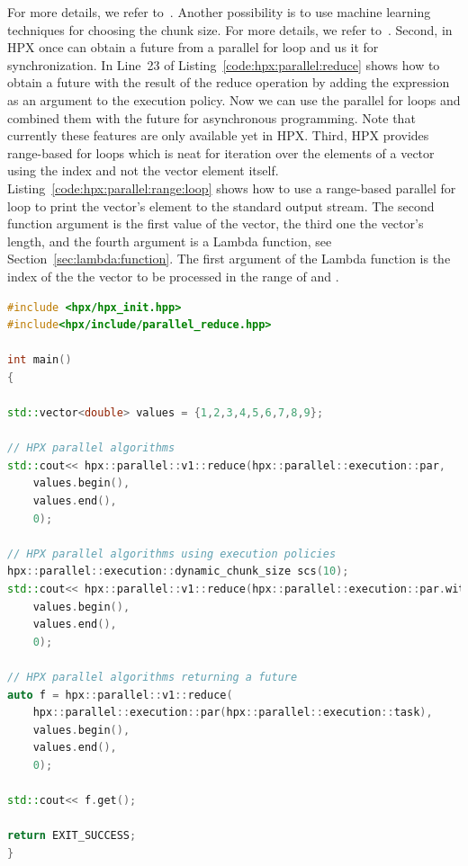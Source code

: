 \documentclass[11pt,fleqn]{book} %
\begin{document}
\vspace{0.25cm}
For more details, we refer to~\cite{grubel2015performance}. Another possibility is to use machine learning techniques for choosing the chunk size. For more details, we refer to~\cite{shirzad2019scheduling}. Second, in HPX once can obtain a future from a parallel for loop and us it for synchronization. In Line~23 of Listing~\ref{code:hpx:parallel:reduce} shows how to obtain a future with the result of the reduce operation by adding the expression  as an argument to the execution policy. Now we can use the parallel for loops and combined them with the future for asynchronous programming. Note that currently these features are only available yet in HPX. Third, HPX provides range-based for loops which is neat for iteration over the elements of a vector using the index and not the vector element itself. Listing~\ref{code:hpx:parallel:range:loop} shows how to use a range-based parallel for loop to print the vector's element to the standard output stream.  The second function argument is the first value of the vector, the third one the vector's length, and the fourth argument is a Lambda function, see Section~\ref{sec:lambda:function}. The first argument of the Lambda function is the index of the the vector to be processed in the range of  and .


\begin{lstlisting}[language=c++,caption={Parallel algorithms (reduce) using HPX.\label{code:hpx:parallel:reduce}},float,floatplacement=tb]
#include <hpx/hpx_init.hpp>
#include<hpx/include/parallel_reduce.hpp>

int main()
{

std::vector<double> values = {1,2,3,4,5,6,7,8,9};

// HPX parallel algorithms
std::cout<< hpx::parallel::v1::reduce(hpx::parallel::execution::par,
	values.begin(),
	values.end(),
	0);
	
// HPX parallel algorithms using execution policies
hpx::parallel::execution::dynamic_chunk_size scs(10);
std::cout<< hpx::parallel::v1::reduce(hpx::parallel::execution::par.with(cs),
	values.begin(),
	values.end(),
	0);
	
// HPX parallel algorithms returning a future
auto f = hpx::parallel::v1::reduce(
	hpx::parallel::execution::par(hpx::parallel::execution::task),
	values.begin(),
	values.end(),
	0);

std::cout<< f.get();
  
return EXIT_SUCCESS;
}

\end{lstlisting}
\end{document}
